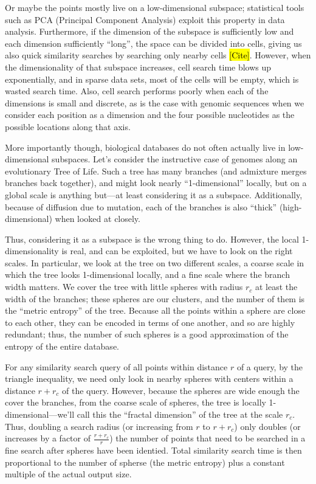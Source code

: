 \documentclass[review,preprint,12pt]{elsarticle}
\theoremstyle{definition}
\theoremstyle{remark}
\numberwithin{equation}{section}
\begin{document}
Or maybe the points mostly live on a low-dimensional subspace; statistical tools such as PCA (Principal Component Analysis) exploit this property in data analysis.
Furthermore, if the dimension of the subspace is sufficiently low and each dimension sufficiently ``long'', the space can be divided into cells, giving us also quick similarity searches by searching only nearby cells \hl{[Cite]}.
However, when the dimensionality of that subspace increases, cell search time blows up exponentially, and in sparse data sets, most of the cells will be empty, which is wasted search time.
Also, cell search performs poorly when each of the dimensions is small and discrete, as is the case with genomic sequences when we consider each position as a dimension and the four possible nucleotides as the possible locations along that axis.

More importantly though, biological databases do not often actually live in low-dimensional subspaces.
Let's consider the instructive case of genomes along an evolutionary Tree of Life.
Such a tree has many branches (and admixture merges branches back together), and might look nearly ``1-dimensional'' locally, but on a global scale is anything but---at least considering it as a subspace.
Additionally, because of diffusion due to mutation, each of the branches is also ``thick'' (high-dimensional) when looked at closely.

Thus, considering it as a subspace is the wrong thing to do.
However, the local 1-dimensionality is real, and can be exploited, but we have to look on the right scales.
In particular, we look at the tree on two different scales, a coarse scale in which the tree looks 1-dimensional locally, and a fine scale where the branch width matters.
We cover the tree with little spheres with radius $r_c$ at least the width of the branches; these spheres are our clusters, and the number of them is the ``metric entropy'' of the tree.
Because all the points within a sphere are close to each other, they can be encoded in terms of one another, and so are highly redundant; thus, the number of such spheres is a good approximation of the entropy of the entire database.

For any similarity search query of all points within distance $r$ of a query, by the triangle inequality, we need only look in nearby spheres with centers within a distance $r+r_c$ of the query.
However, because the spheres are wide enough the cover the branches, from the coarse scale of spheres, the tree is locally 1-dimensional---we'll call this the ``fractal dimension'' of the tree at the scale $r_c$.
Thus, doubling a search radius (or increasing from $r$ to $r+r_c$) only doubles (or increases by a factor of $\frac{r+r_c}{r}$) the number of points that need to be searched in a fine search after spheres have been identied.
Total similarity search time is then proportional to the number of spherse (the metric entropy) plus a constant multiple of the actual output size.
\end{document}
